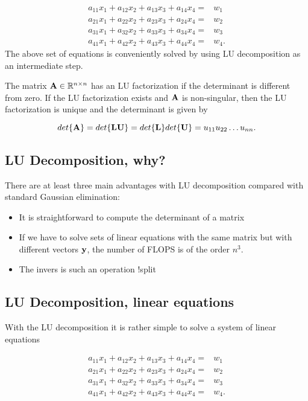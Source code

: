 \documentclass[%
twoside,                 %
final,                   %
10pt]{article}
\begin{document}
{{{{\begin{align}
 a_{11}x_1 +a_{12}x_2 +a_{13}x_3 + a_{14}x_4=&w_1 \nonumber \\
a_{21}x_1 + a_{22}x_2 + a_{23}x_3 + a_{24}x_4=&w_2 \nonumber \\
a_{31}x_1 + a_{32}x_2 + a_{33}x_3 + a_{34}x_4=&w_3 \nonumber \\
a_{41}x_1 + a_{42}x_2 + a_{43}x_3 + a_{44}x_4=&w_4.  \nonumber
\end{align}
The above set of equations is conveniently solved by using LU decomposition as an intermediate step.

The matrix ${\bf A}\in \mathbb{R}^{n\times n}$ has an LU factorization if the determinant
is different from zero. If the LU factorization exists and ${\bf A}$ is non-singular, then the LU factorization
is unique and the determinant is given by

\[
det\{{\bf A}\}=det\{{\bf LU}\}= det\{{\bf L}\}det\{{\bf U}\}=u_{11}u_{22}\dots u_{nn}.
\]

\subsection{LU Decomposition, why?}

There are at least three main advantages with LU decomposition compared with standard Gaussian elimination:

\begin{itemize}
  \item It is straightforward to compute the determinant of a matrix

  \item If we have to solve sets of linear equations with the same matrix but with different vectors ${\bf y}$, the number of FLOPS is of the order $n^3$.

  \item The invers is such an operation !split
\end{itemize}

\noindent
\subsection{LU Decomposition, linear equations}

With the LU decomposition it is rather
simple to solve a system of linear equations

\begin{align}
 a_{11}x_1 +a_{12}x_2 +a_{13}x_3 + a_{14}x_4=&w_1 \nonumber \\
a_{21}x_1 + a_{22}x_2 + a_{23}x_3 + a_{24}x_4=&w_2 \nonumber \\
a_{31}x_1 + a_{32}x_2 + a_{33}x_3 + a_{34}x_4=&w_3 \nonumber \\
a_{41}x_1 + a_{42}x_2 + a_{43}x_3 + a_{44}x_4=&w_4. \nonumber
\end{align}

}}}}
\end{document}
